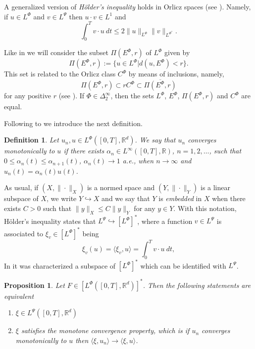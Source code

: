 \documentclass[twoside]{article}
\newtheorem{defi}[thm]{Definition}
\newtheorem{prop}[thm]{Proposition}
\theoremstyle{remark}
\newcommand{\orlnor}{\|_{L^{\Phi}}}
\newcommand{\lphi}{L^{\Phi}}
\newcommand{\lpsi}{L^{\Psi}}
\newcommand{\ephi}{E^{\Phi}}
\newcommand{\claseor}{C^{\Phi}}
\newcommand{\rr}{\mathbb{R}}
\renewcommand{\leq}{\leqslant}
\newcommand{\Phie}{\Phi^{*}}
\begin{document}
A generalized version of \emph{H\"older's inequality} holds in Orlicz spaces (see \cite[Thm. 4.1]{Skaff1969}). Namely, if $u\in\lphi$ and $v\in\lpsi$ then $u\cdot v\in L^1$ and
\begin{equation}\label{holder}
\int_0^Tv\cdot u\ dt\leq 2 \|u\orlnor\|v\|_{L^{\Phie}}.
\end{equation}


Like in \cite{KR} we will consider the subset $\Pi(\ephi,r)$ of $\lphi$ given by
\[\Pi(\ephi,r):=\{u\in\lphi| d(u,\ephi)<r\}.\]
This set is related to the Orlicz class $\claseor$ by means of inclusions, namely,
\begin{equation}\label{eq:inclusiones}\Pi(\ephi, r )\subset r \claseor\subset\overline{\Pi(\ephi,r)}
\end{equation}
for any positive $r$ (see \cite[Thm. 5.6]{Orliczvectorial2005}).
If $\Phi \in \Delta_2^{\infty}$,  then the sets $\lphi$, $\ephi$, $\Pi(\ephi,r)$ and $\claseor$ are equal.

Following to \cite{Desch2001} we introduce the next definition.

\begin{defi} Let $u_n,u\in\lphi([0,T],\rr^d)$. We say that $u_n$ converges monotonically to $u$ if there exists $\alpha_n\in L^{\infty}([0,T],\rr)$, $n=1,2,\ldots$, such that $0\leq \alpha_n(t)\leq \alpha_{n+1}(t)$, $\alpha_n(t)\to 1$ a.e., when $n\to\infty$ and $u_n(t)=\alpha_n(t)u(t)$.

\end{defi}

 
As usual, if $(X,\|\cdot\|_X)$ is a normed space and $(Y,\|\cdot \|_Y)$ is a linear subspace of $X$,  we write $Y\hookrightarrow X$ and we say that $Y$ is \emph{embedded} in $X$  when there exists $C>0$ such that
$\|y\|_X\leq C\|y\|_Y$ for any $y\in Y$.  With this notation, H\"older's inequality states that  $\lpsi\hookrightarrow  \left[\lphi\right]^*$, where a function $v\in\lpsi$ is associated  to $\xi_v\in \left[\lphi\right]^*$ being
\begin{equation}\label{pairing}
  \xi_v(u)=\langle \xi_v,u\rangle=\int_0^Tv\cdot u\ dt,
\end{equation}
 In  \cite[Thm 2.9]{Desch2001}  it was characterized a subspace of   $\left[\lphi\right]^*$ which can be identified with $\lpsi$.

 \begin{prop} Let $F\in\left[\lphi([0,T],\rr^d)\right]^*$. Then the following statements are equivalent
 \begin{enumerate}
  \item $\xi\in \lpsi([0,T],\rr^d)$
  \item $\xi$ satisfies the \emph{monotone convergence property}, which is if $u_n$ converges monotonically to $u$ then $\langle \xi,u_n\rangle\to \langle \xi,u\rangle$.
 \end{enumerate}
 \end{prop}
\end{document}
